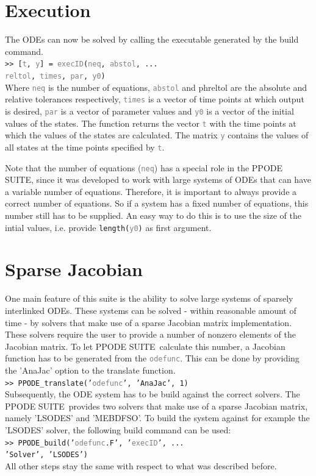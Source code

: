 \documentclass[a4paper,10pt,twocolumn]{article}
\newcommand{\PPODESUITE}{PPODE SUITE}
\newcommand{\matlabcmd}[1]{\\\indent\texttt{\footnotesize >> #1}\\}
\newcommand{\matlabcmdinline}[1]{\textacutedbl\texttt{\footnotesize#1}\textgravedbl}
\newcommand{\ph}[1]{\texttt{\footnotesize \textcolor{gray}{\textlangle #1\textrangle}}}
\begin{document}
\section{Execution}
The ODEs can now be solved by calling the executable generated by the build command.
\matlabcmd{[\ph{t}, \ph{y}] = \ph{execID}(\ph{neq}, \ph{abstol}, ...\\ \ph{reltol}, \ph{times}, \ph{par}, \ph{y0})}
Where \ph{neq} is the number of equations, \ph{abstol} and ph{reltol} are the absolute and relative tolerances respectively, \ph{times} is a vector of time points at which output is desired, \ph{par} is a vector of parameter values and \ph{y0} is a vector of the initial values of the states. The function returns the vector \ph{t} with the time points at which the values of the states are calculated. The matrix \ph{y} contains the values of all states at the time points specified by \ph{t}.

Note that the number of equations (\ph{neq}) has a special role in the \PPODESUITE, since it was developed to work with large systems of ODEs that can have a variable number of equations. Therefore, it is important to always provide a correct number of equations. So if a system has a fixed number of equations, this number still has to be supplied. An easy way to do this is to use the size of the intial values, i.e. provide \matlabcmdinline{length(\ph{y0})} as first argument.

\section{Sparse Jacobian}
One main feature of this suite is the ability to solve large systems of sparsely interlinked ODEs. These systems can be solved - within reasonable amount of time - by solvers that make use of a sparse Jacobian matrix implementation. These solvers require the user to provide a number of nonzero elements of the Jacobian matrix. To let \PPODESUITE~calculate this number, a Jacobian function has to be generated from the \ph{odefunc}. This can be done by providing the 'AnaJac' option to the translate function.
\matlabcmd{PPODE\_translate('\ph{odefunc}', 'AnaJac', 1)}
Subsequently, the ODE system has to be build against the correct solvers. The \PPODESUITE~provides two solvers that make use of a sparse Jacobian matrix, namely 'LSODES' and 'MEBDFSO'. To build the system against for example the 'LSODES' solver, the following build command can be used:
\matlabcmd{PPODE\_build('\ph{odefunc}.F', '\ph{execID}', ... \\ 'Solver', 'LSODES')}
All other steps stay the same with respect to what was described before.
\end{document}
